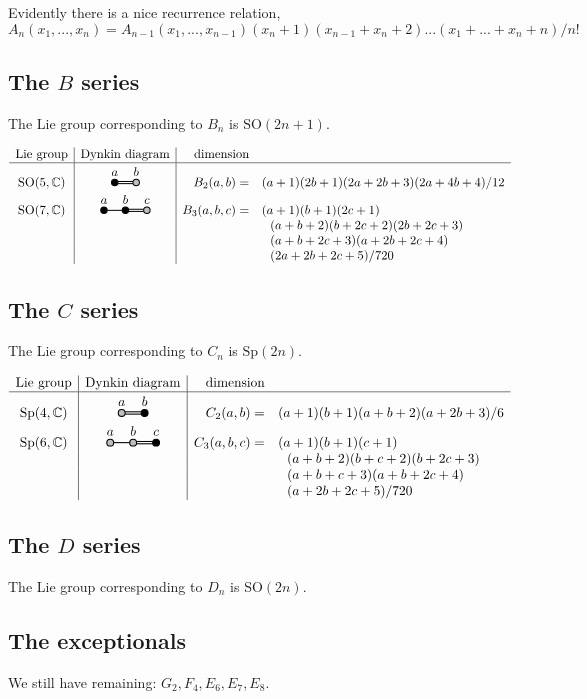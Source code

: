 \documentclass[11pt,oneside]{article}
\newcommand{\Complex}{\mathbb{C}}
\newcommand{\SO}{\mathrm{SO}}
\newcommand{\Sp}{\mathrm{Sp}}
\begin{document}
Evidently there is a nice recurrence relation,
$$
    A_n(x_1,...,x_n) = A_{n-1}(x_1,...,x_{n-1})
    (x_n + 1)
    (x_{n-1} + x_n + 2)
    ...
    (x_1 + ... + x_n + n) 
    / n!
$$

\subsection{The $B$ series}

The Lie group corresponding to $B_n$ is $\SO(2n+1).$

$$
\begin{array}{c|c|rl}
\text{Lie group} & \text{Dynkin diagram} & \text{dimension} & \\
\hline
\SO(5,\Complex) & \DynkinBab  & B_2(a,b) =& (a+1)(2b+1)(2a+2b+3)(2a+4b+4)/12 \\
\SO(7,\Complex) & \DynkinBabc & B_3(a,b,c) =& (a+1)(b+1)(2c+1) \\
                             & & &\ \ (a+b+2)(b+2c+2)(2b+2c+3) \\
                             & & &\ \ (a+b+2c+3)(a+2b+2c+4) \\
            & & &\ \ (2a+2b+2c+5)/720 \\
\end{array}
$$


\subsection{The $C$ series}

The Lie group corresponding to $C_n$ is $\Sp(2n).$

$$
\begin{array}{c|c|rl}
\text{Lie group} & \text{Dynkin diagram} & \text{dimension} & \\
\hline
\Sp(4,\Complex) & \DynkinCab  & C_2(a,b) =& (a+1)(b+1)(a+b+2)(a+2b+3)/6 \\
\Sp(6,\Complex) & \DynkinCabc & C_3(a,b,c) =& (a+1)(b+1)(c+1) \\
                             & & &\ \ (a+b+2)(b+c+2)(b+2c+3)\\
                             & & &\ \ (a+b+c+3)(a+b+2c+4)\\
            & & &\ \ (a+2b+2c+5)/720 \\
\end{array}
$$

\subsection{The $D$ series}

The Lie group corresponding to $D_n$ is $\SO(2n).$

\subsection{The exceptionals}

We still have remaining: $G_2, F_4, E_6, E_7, E_8.$


{}

\end{document}

